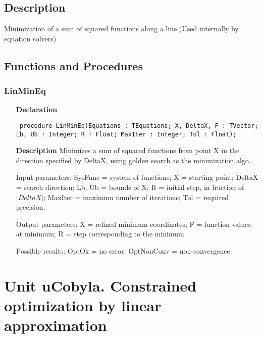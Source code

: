 \documentclass[12pt,a4paper,oneside]{report}
\newcommand{\declarationitem}[1]{\textbf{#1}}
\newcommand{\descriptiontitle}[1]{\textbf{#1}}
\newcommand{\code}[1]{\texttt{#1}}
\begin{document}
\subsection{Description}
Minimization of a sum of squared functions along a line (Used internally by equation solvers) 
\subsection{Functions and Procedures}
\subsubsection{LinMinEq}
\label{ulinminq-LinMinEq}
\begin{itemize}\item[\declarationitem{Declaration}\hfill]
	\begin{flushleft}
		\code{
			procedure LinMinEq(Equations : TEquations; X, DeltaX, F : TVector; Lb, Ub : Integer; R : Float; MaxIter : Integer; Tol : Float);}
		
	\end{flushleft}
	
	\par
	\item[\descriptiontitle{Description}]
	Minimizes a sum of squared functions from point X in the direction specified by DeltaX, using golden search as the minimization algo.
	
	Input parameters: SysFunc = system of functions; X = starting point; DeltaX = search direction; Lb, Ub = bounds of X; R = initial step, in fraction of $|DeltaX|$; MaxIter = maximum number of iterations; Tol = required precision.
	
	Output parameters: X = refined minimum coordinates; F = function values at minimum; R = step corresponding to the minimum.
	
	Possible results: OptOk = no error; OptNonConv = non{-}convergence.
\end{itemize}

\section[unit uCobyla]{Unit uCobyla. Constrained optimization by linear approximation}\label{sec:unit-ucobyla}
\end{document}

